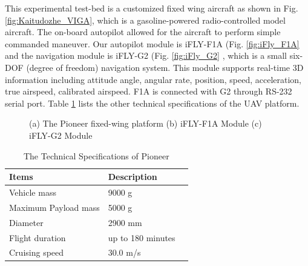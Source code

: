 This experimental test-bed is a customized fixed wing aircraft as shown in Fig. \ref{fig:Kaitudozhe_VIGA}, which is a gasoline-powered radio-controlled model aircraft. The on-board autopilot allowed for the aircraft to perform simple commanded maneuver. Our autopilot module is iFLY-F1A (Fig. \ref{fig:iFly_F1A} and the navigation module is iFLY-G2 (Fig. \ref{fig:iFly_G2} \cite{IFLY}, which is a small six-DOF (degree of freedom) navigation system. This module supports real-time 3D information including attitude angle, angular rate, position, speed, acceleration, true airspeed, calibrated airspeed. F1A is connected with G2 through RS-232 serial port. Table \ref{tab:platform_specifications} lists the other technical specifications of the UAV platform.

\begin{figure}[!tb]
	\centering
	\caption{(a) The Pioneer fixed-wing platform (b) iFLY-F1A Module   (c) iFLY-G2 Module}
\end{figure}



\begin{table}
	\caption{The Technical Specifications of Pioneer}
	\label{tab:platform_specifications}
	\begin{center}
		\renewcommand{\arraystretch}{1.1}
		\begin{tabular}{lll}
			\hline
			\textbf {Items}  & \textbf{Description} \\
			\hline
			Vehicle mass & 9000 g \\
			Maximum Payload mass & 5000 g \\
			Diameter & 2900 mm \\
			Flight duration & up to 180 minutes \\
			Cruising speed & 30.0 m/s \\
			\hline
		\end{tabular}
	\end{center}
\end{table}

